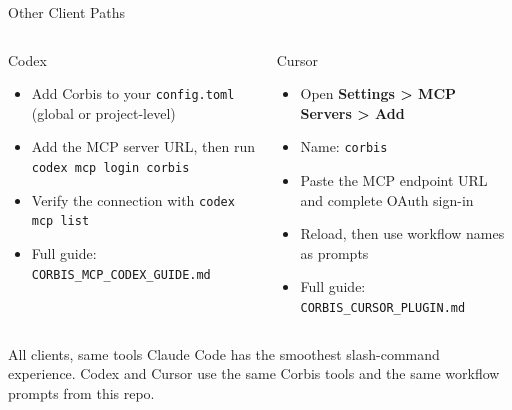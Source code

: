\documentclass[aspectratio=169,professionalfonts]{beamer}
\begin{document}
\begin{frame}[t]{Other Client Paths}
\footnotesize
\begin{columns}[T,onlytextwidth]
\begin{block}{Codex}
\begin{itemize}
  \item Add Corbis to your \texttt{config.toml} (global or project-level)
  \item Add the MCP server URL, then run \texttt{codex mcp login corbis}
  \item Verify the connection with \texttt{codex mcp list}
  \item Full guide: \texttt{CORBIS\_MCP\_CODEX\_GUIDE.md}
\end{itemize}
\end{block}
\begin{block}{Cursor}
\begin{itemize}
  \item Open \textbf{Settings > MCP Servers > Add}
  \item Name: \texttt{corbis}
  \item Paste the MCP endpoint URL and complete OAuth sign-in
  \item Reload, then use workflow names as prompts
  \item Full guide: \texttt{CORBIS\_CURSOR\_PLUGIN.md}
\end{itemize}
\end{block}
\end{columns}
\vspace{0.5em}
\begin{exampleblock}{All clients, same tools}
Claude Code has the smoothest slash-command experience. Codex and Cursor use the same Corbis tools and the same workflow prompts from this repo.
\end{exampleblock}
\end{frame}
\end{document}
